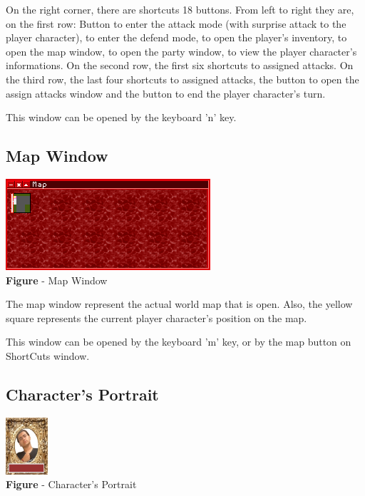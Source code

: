 \documentclass[ letterpaper,12pt]{article}
\begin{document}
On the right corner, there are shortcuts 18 buttons. From left to right they are, on the first row: Button to enter the attack mode (with surprise attack to the player character), to enter the defend mode, to open the player's inventory, to open the map window, to open the party window, to view the player character's informations. On the second row, the first six shortcuts to assigned attacks. On the third row, the last four shortcuts to assigned attacks, the button to open the assign attacks window and the button to end the player character's turn.

This window can be opened by the keyboard 'n' key.

\subsection{Map Window}

\begin{center}
  \includegraphics{mapWindow.png}
\\{\bf Figure} - Map Window
\end{center}

The map window represent the actual world map that is open. Also, the yellow square represents the current player character's position on the map. 

This window can be opened by the keyboard 'm' key, or by the map button on ShortCuts window.

\subsection{Character's Portrait}

\begin{center}
  \includegraphics{portrait.png}
\\{\bf Figure} - Character's Portrait
\end{center}
\end{document}
